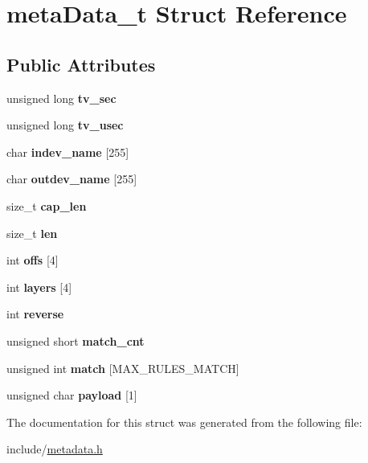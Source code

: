 \hypertarget{structmetaData__t}{}\section{meta\+Data\+\_\+t Struct Reference}
\label{structmetaData__t}
\subsection*{Public Attributes}
\begin{DoxyCompactItemize}
\item 
\mbox{\label{structmetaData__t_a2342310924daa73d95516c4de4577f65}} 
unsigned long {\bfseries tv\+\_\+sec}
\item 
\mbox{\label{structmetaData__t_a73a992c06df404ecdd5329ac2cbd4184}} 
unsigned long {\bfseries tv\+\_\+usec}
\item 
\mbox{\label{structmetaData__t_a83e27493d1b587ccc69841f248f8792b}} 
char {\bfseries indev\+\_\+name} \mbox{[}255\mbox{]}
\item 
\mbox{\label{structmetaData__t_a562a3476e5b43e4dfa3bf3ac713c552e}} 
char {\bfseries outdev\+\_\+name} \mbox{[}255\mbox{]}
\item 
\mbox{\label{structmetaData__t_a60d44370774b3c26d84f22f9178eff7f}} 
size\+\_\+t {\bfseries cap\+\_\+len}
\item 
\mbox{\label{structmetaData__t_a261d19a12920810a456aa4f226471f57}} 
size\+\_\+t {\bfseries len}
\item 
\mbox{\label{structmetaData__t_a924f583ec0509070c680d617efa93c7f}} 
int {\bfseries offs} \mbox{[}4\mbox{]}
\item 
\mbox{\label{structmetaData__t_a76b2be218e05f422ef10d0a7c5269886}} 
int {\bfseries layers} \mbox{[}4\mbox{]}
\item 
\mbox{\label{structmetaData__t_ae4d1c9a61cfd4ff105de96b26523469f}} 
int {\bfseries reverse}
\item 
\mbox{\label{structmetaData__t_a973a84a4d6d58d2d532eda96c4e82f2d}} 
unsigned short {\bfseries match\+\_\+cnt}
\item 
\mbox{\label{structmetaData__t_a5dafc371fd326818994b58f1554cf481}} 
unsigned int {\bfseries match} \mbox{[}M\+A\+X\+\_\+\+R\+U\+L\+E\+S\+\_\+\+M\+A\+T\+CH\mbox{]}
\item 
\mbox{\label{structmetaData__t_a93200edb75f0b6fed9285ee04581a847}} 
unsigned char {\bfseries payload} \mbox{[}1\mbox{]}
\end{DoxyCompactItemize}


The documentation for this struct was generated from the following file\+:\begin{DoxyCompactItemize}
\item 
include/\hyperlink{metadata_8h}{metadata.\+h}\end{DoxyCompactItemize}
